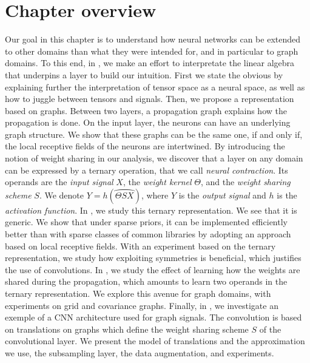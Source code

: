 \section*{Chapter overview}

Our goal in this chapter is to understand how neural networks can be extended to other domains than what they were intended for, and in particular to graph domains. To this end, in , we make an effort to interpretate the linear algebra that underpins a layer to build our intuition. First we state the obvious by explaining further the interpretation of tensor space as a neural space, as well as how to juggle between tensors and signals. Then, we propose a representation based on graphs. Between two layers, a propagation graph explains how the propagation is done. On the input layer, the neurons can have an underlying graph structure. We show that these graphs can be the same one, if and only if, the local receptive fields of the neurons are intertwined. By introducing the notion of weight sharing in our analysis, we discover that a layer on any domain can be expressed by a ternary operation, that we call \emph{neural contraction}. Its operands are the \emph{input signal} $X$, the \emph{weight kernel} $\Theta$, and the \emph{weight sharing scheme} $S$. We denote $Y = h\left(\wideparen{\Theta S X}\right)$, where $Y$ is the \emph{output signal} and $h$ is the \emph{activation function}. In , we study this ternary representation. We see that it is generic. We show that under sparse priors, it can be implemented efficiently better than with sparse classes of common libraries by adopting an approach based on local receptive fields. With an experiment based on the ternary representation, we study how exploiting symmetries is beneficial, which justifies the use of convolutions. In , we study the effect of learning how the weights are shared during the propagation, which amounts to learn two operands in the ternary representation. We explore this avenue for graph domains, with experiments on grid and covariance graphs. Finally, in , we investigate an exemple of a CNN architecture used for graph signals. The convolution is based on translations on graphs which define the weight sharing scheme $S$ of the convolutional layer. We present the model of translations and the approximation we use, the subsampling layer, the data augmentation, and experiments.

